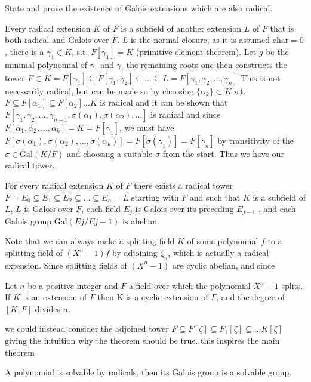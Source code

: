 State and prove the existence of Galois extensions which are also radical.

Every radical extension \(K\) of \(F\) is a subfield of another extension \(L\) of \(F\) that
is both radical and Galois over \(F\).
\(L\) is the normal closure, as it is assumed \(\text{char} = 0\), there is a \(\gamma_1 \in K\), s.t. \(F[\gamma_1] = K\) 
(primitive element theorem). Let \(g\) be the minimal polynomial of \(\gamma_1\) and \(\gamma_i\) the remaining roots
one then constructs the tower
\(F \subset K = F[\gamma_1] \subseteq F[\gamma_1, \gamma_2] \subseteq \dots \subseteq L = F[\gamma_1, \gamma_2, \dots, \gamma_n]\)
This is not necessarily radical, but can be made so by choosing \(\{\alpha_k\} \subset K\) s.t. \(F \subseteq F[\alpha_1] \subseteq F[\alpha_2] \dots K\)
is radical and it can be shown that \(F[\gamma_1, \gamma_2, \dots, \gamma_{n-1}, \sigma(\alpha_1), \sigma(\alpha_2), \dots]\) is radical and since 
\(F[\alpha_1,\alpha_2,\dots,\alpha_k] = K = F[\gamma_1]\), we must have \(F[\sigma(\alpha_1), \sigma(\alpha_2),\dots,\sigma(\alpha_k)] = F[\sigma(\gamma_1)] = F[\gamma_n]\)
by transitivity of the \(\sigma \in \text{Gal}(K/F)\) and choosing a suitable \(\sigma\) from the start. Thus we have our radical tower.

For every radical extension \(K\) of \(F\) there exists a radical tower
\(F = E_0 \subseteq E_1 \subseteq E_2 \subseteq \dots \subseteq E_n = L\)
starting with \(F\) and such that
\(K\) is a subfield of \(L\),
\(L\) is Galois over \(F\),
each field \(E_j\) is Galois over its preceding \(E_{j−1}\) , and
each Galois group \(\text{Gal}(Ej/Ej−1)\) is abelian.

Note that we can always make a splitting field \(K\) of some polynomial \(f\) to a splitting field
of \((X^{n} - 1)f\) by adjoining \(\zeta_n\), which is actually a radical extension. Since splitting fields
of \((X^{n} - 1)\) are cyclic abelian, and since

Let \(n\) be a positive integer and \(F\) a field over which the polynomial \(X^n − 1\)
splits. If \(K\) is an extension of \(F\) then K is a cyclic extension
of \(F\), and the degree of \([K : F]\) divides \(n\).

we could instead consider the adjoined tower \(F \subseteq F[\zeta] \subseteq F_1[\zeta] \subseteq \dots K[\zeta]\)
giving the intuition why the theorem should be true.
this inspires the main theorem

A polynomial is solvable by radicals, then its Galois group is a solvable group.

